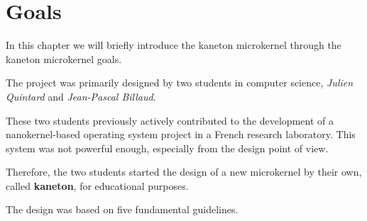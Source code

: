 %
%
%
%
%
%

%
%

\chapter{Goals}
\label{chapter:goals}

In this chapter we will briefly introduce the kaneton microkernel
through the kaneton microkernel goals.

\newpage

%
%

The project was primarily designed by two students in computer science,
\textit{Julien Quintard} and \textit{Jean-Pascal Billaud}.

These two students previously actively contributed to the development
of a nanokernel-based operating system project in a French research laboratory.
This system was not powerful enough, especially from the design point of view.

Therefore, the two students started the design of a new microkernel
by their own, called \textbf{kaneton}, for educational purposes.

The design was based on five fundamental guidelines.

